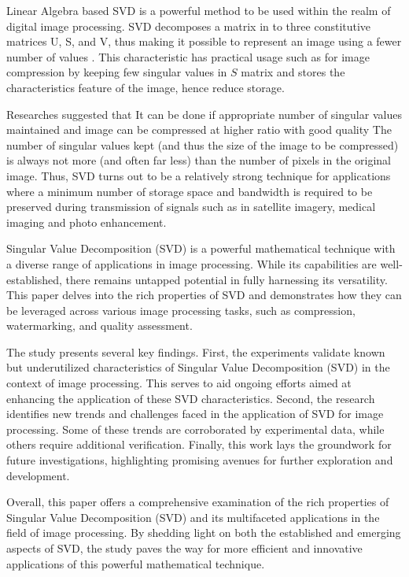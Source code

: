 \documentclass[
  journal,
]{IEEEtran}%
\begin{document}
Linear Algebra based SVD is a powerful method to be used within the
realm of digital image processing. SVD decomposes a matrix in to three
constitutive matrices U, S, and V, thus making it possible to represent
an image using a fewer number of values
. This characteristic has
practical usage such as for image compression by keeping few singular
values in \(S\) matrix and stores the characteristics feature of the
image, hence reduce storage.

Researches suggested that It can be done if appropriate number of
singular values maintained and image can be compressed at higher ratio
with good quality The number of singular values kept (and thus the size
of the image to be compressed) is always not more (and often far less)
than the number of pixels in the original image. Thus, SVD turns out to
be a relatively strong technique for applications where a minimum number
of storage space and bandwidth is required to be preserved during
transmission of signals such as in satellite imagery, medical imaging
and photo enhancement.

Singular Value Decomposition (SVD) is a powerful mathematical technique
with a diverse range of applications in image processing. While its
capabilities are well-established, there remains untapped potential in
fully harnessing its versatility. This paper delves into the rich
properties of SVD and demonstrates how they can be leveraged across
various image processing tasks, such as compression, watermarking, and
quality assessment.

The study presents several key findings. First, the experiments validate
known but underutilized characteristics of Singular Value Decomposition
(SVD) in the context of image processing. This serves to aid ongoing
efforts aimed at enhancing the application of these SVD characteristics.
Second, the research identifies new trends and challenges faced in the
application of SVD for image processing. Some of these trends are
corroborated by experimental data, while others require additional
verification. Finally, this work lays the groundwork for future
investigations, highlighting promising avenues for further exploration
and development.

Overall, this paper offers a comprehensive examination of the rich
properties of Singular Value Decomposition (SVD) and its multifaceted
applications in the field of image processing. By shedding light on both
the established and emerging aspects of SVD, the study paves the way for
more efficient and innovative applications of this powerful mathematical
technique.
\end{document}

